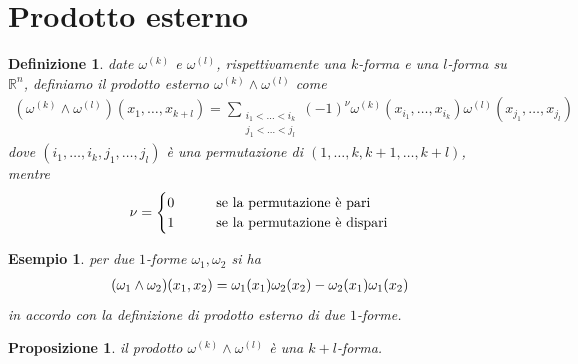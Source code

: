 \documentclass[twoside, 11pt]{amsbook}
\newcommand{\0}{{(0)}}
\newcommand{\3}{{(3)}}
\theoremstyle{colonplain}
\newtheorem{prop}[thm]{Proposizione}
\theoremstyle{colondefinition}
\newtheorem{defn}[thm]{Definizione}
\newtheorem{ex}[thm]{Esempio}
\theoremstyle{colonremark}
\numberwithin{equation}{chapter}
\begin{document}
\section{Prodotto esterno}
\begin{defn} date $\omega^{(k)}$ e $\omega^{(l)}$, rispettivamente una $k$-forma e una $l$-forma su $\mathbb{R}^n$, definiamo il prodotto esterno $\omega^{(k)} \wedge \omega^{(l)}$ come
\begin{align}\label{ExtProdDefn}
    (\omega^{(k)} \wedge \omega^{(l)})(x_1, \dots, x_{k + l}) = \sum_{\substack{i_1 < \dots < i_k \\ j_1 < \dots < j_l}}(-1)^\nu \omega^{(k)}(x_{i_1}, \dots, x_{i_k})\omega^{(l)}(x_{j_1}, \dots, x_{j_l}) 
\end{align}
dove $(i_1, \dots, i_k, j_1, \dots, j_l)$ è una permutazione di $(1, \dots, k, k + 1, \dots, k + l)$, mentre 
\begin{align}
    \nu = \begin{cases}
        0 \qquad &\text{se la permutazione è pari} \\
        1 \qquad &\text{se la permutazione è dispari}
    \end{cases} \notag
\end{align}
\end{defn}
\begin{ex} per due $1$-forme $\omega_1, \omega_2$ si ha 
\begin{align}
    (\omega_1 \wedge \omega_2)(x_1, x_2) = \omega_1(x_1)\omega_2(x_2) - \omega_2(x_1)\omega_1(x_2) \notag
\end{align}
in accordo con la definizione di prodotto esterno di due $1$-forme.
\end{ex}
\begin{prop} il prodotto $\omega^{(k)} \wedge \omega^{(l)}$ è una $k + l$-forma.
\end{prop}
\end{document}
